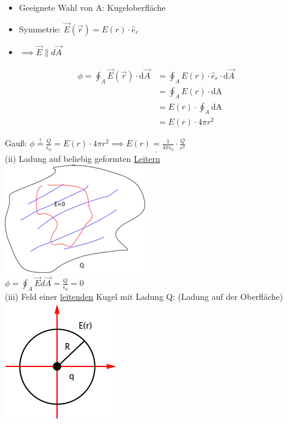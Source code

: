 \documentclass[11pt]{article}
\begin{document}
\begin{itemize}
	\item Geeignete Wahl von A: Kugeloberfläche
	\item Symmetrie: $\vec{E}(\vec{r})=E(r)\cdot\hat e_r$
	\item $\implies \vec{E}\parallel d\vec{A}$
\end{itemize}

\begin{align*}
	\phi=\oint_{A}\vec{E}(\vec{r})\cdot\mathrm{d}\vec{A} & = \oint_{A}E(r)\cdot\hat{e}_r\cdot\mathrm{d}\vec{A}\\
	&=\oint_{A}E(r)\cdot\mathrm{dA}\\
	&= E(r)\cdot\oint_{A}\mathrm{dA}\\
	&= E(r)\cdot4\pi r^2
\end{align*}

Gauß: $\phi\overset{!}{=} \frac{Q}{\epsilon_0}=E(r)\cdot4\pi r^2 \implies \underline{E(r)=\frac{1}{4\pi\epsilon_0}\cdot\frac{Q}{r^2}}$\\

(ii) Ladung auf beliebig geformten \underline{Leitern}\\

\includegraphics{skizzen/14/14_6B3}\\

$\phi=\oint_{A}\vec{E}d\vec{A}=\frac{Q}{\epsilon_0}=0$\\

(iii) Feld einer \underline{leitenden} Kugel mit Ladung Q: (Ladung auf der Oberfläche)\\

\includegraphics{skizzen/14/14_6B4}\\
\end{document}
